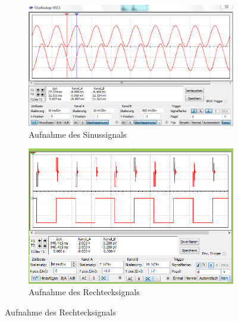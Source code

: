 \documentclass[12pt,a4paper]{article}
\begin{document}
\begin{figure}[H]
        \centering
        \begin{subfigure}[t]{0.28\textwidth}
                \includegraphics[width=\textwidth , scale = 0.4]{4_3_sin.PNG}
                \caption[Aufnahme des Sinussignals]{Aufnahme des Sinussignals}
                \label{fig:4_3_sin}
        \end{subfigure}%
        \hfill
        \begin{subfigure}[t]{0.28\textwidth}
                \includegraphics[width=\textwidth , scale = 0.4]{4_3_recht.PNG}
                \caption[Aufnahme des Rechtecksignals]{Aufnahme des Rechtecksignals}
                \label{fig:4_3_recht}
        \end{subfigure}

\end{figure}
\end{document}

